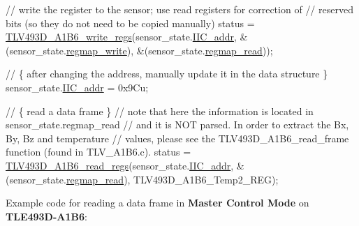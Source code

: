 \begin{DoxyCode}
\textcolor{comment}{// write the register to the sensor; use read registers for correction of}
\textcolor{comment}{// reserved bits (so they do not need to be copied manually)}
status = \mbox{\hyperlink{_t_l_v___a1_b6__driver_8c_a193d021b21978abf81eba392c7b52ce5}{TLV493D\_A1B6\_write\_regs}}(sensor\_state.\mbox{\hyperlink{struct_t_l_v493_d__data__t_a047c4ab12450e0186489f3bfadc8cbc4}{IIC\_addr}},
                                &(sensor\_state.\mbox{\hyperlink{struct_t_l_v493_d__data__t_aa17835fca124976dc402c4305da2b724}{regmap\_write}}),
                                &(sensor\_state.\mbox{\hyperlink{struct_t_l_v493_d__data__t_a8160052cc383f9ec602c96f41922952b}{regmap\_read}}));

\textcolor{comment}{// \{ after changing the address, manually update it in the data structure \}}
sensor\_state.\mbox{\hyperlink{struct_t_l_v493_d__data__t_a047c4ab12450e0186489f3bfadc8cbc4}{IIC\_addr}} = 0x9Cu;

\textcolor{comment}{// \{ read a data frame \}}
\textcolor{comment}{// note that here the information is located in sensor\_state.regmap\_read}
\textcolor{comment}{// and it is NOT parsed. In order to extract the Bx, By, Bz and temperature}
\textcolor{comment}{// values, please see the TLV493D\_A1B6\_read\_frame function (found in TLV\_A1B6.c).}
status = \mbox{\hyperlink{_t_l_v___a1_b6__driver_8c_a80bcc62ca392203dbdabcd529f35c35b}{TLV493D\_A1B6\_read\_regs}}(sensor\_state.\mbox{\hyperlink{struct_t_l_v493_d__data__t_a047c4ab12450e0186489f3bfadc8cbc4}{IIC\_addr}},
                                &(sensor\_state.\mbox{\hyperlink{struct_t_l_v493_d__data__t_a8160052cc383f9ec602c96f41922952b}{regmap\_read}}),
                                TLV493D\_A1B6\_Temp2\_REG);
\end{DoxyCode}


Example code for reading a data frame in {\bfseries Master Control Mode} on {\bfseries T\+L\+E493\+D-\/\+A1\+B6}\+: ~\newline
 
